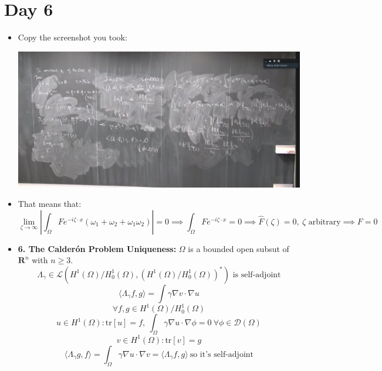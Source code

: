 \documentclass{article}
\begin{document}
\section*{Day 6}
\begin{itemize}
    \item Copy the screenshot you took:
    
    \includegraphics[width=\textwidth]{screenshots/1.png}

    \item That means that:
    \begin{equation}
        \lim_{\zeta \rightarrow \infty} |\int_\Omega F e^{-i\zeta \cdot x} (\omega_1 + \omega_2 + \omega_1\omega_2)| = 0  \implies  \int_\Omega F e^{-i\zeta \cdot x} = 0  \implies  \hat{F}(\zeta) = 0, \ \zeta \text{ arbitrary} \implies F = 0
    \end{equation}

    \item \textbf{6. The Calderón Problem Uniqueness:} $\Omega$ is a bounded open subsut of $\mathbf{R}^n$ with $ n\geq 3$.
    \begin{equation}
        \Lambda_\gamma \in \mathcal{L}(H^1(\Omega)/H^1_0(\Omega), (H^1(\Omega)/H^1_0(\Omega))^*) \text{ is self-adjoint}
    \end{equation}
    \begin{equation}
        \langle \Lambda_\gamma  f, g \rangle = \int \gamma \nabla v \cdot \nabla u
    \end{equation}
    \begin{equation}
        \forall f, g \in H^1(\Omega)/H^1_0(\Omega)
    \end{equation}
    \begin{equation}
        u \in H^1(\Omega): \text{tr} [u] = f, \ \int_\Omega \gamma \nabla u \cdot \nabla \phi = 0 \ \forall \phi \in \mathcal{D}(\Omega)
    \end{equation}
    \begin{equation}
         v \in H^1(\Omega): \text{tr} [v] = g
    \end{equation}
    \begin{equation}
        \langle \Lambda_\gamma  g, f \rangle = \int_\Omega \gamma \nabla u \cdot \nabla v = \langle \Lambda_\gamma  f, g \rangle \ \text{so it's self-adjoint}
    \end{equation}


\end{itemize}
\end{document}
